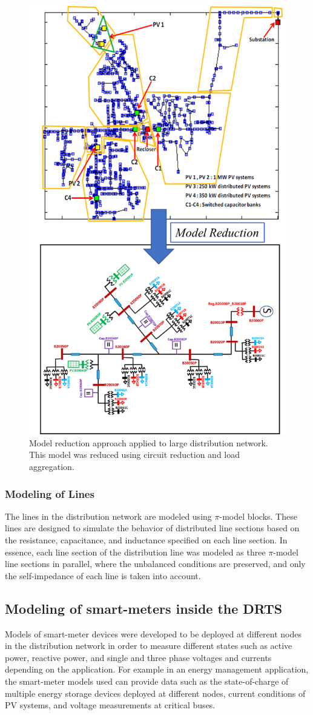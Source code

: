 \begin{figure}[!ht]
    \centering
    \includegraphics[width = 0.5\linewidth]{figs_juan/model_reduction.png}
    \caption{Model reduction approach applied to large distribution network. This model was reduced using circuit reduction and load aggregation.}
    \label{fig:modelreduction}
\end{figure}





\subsubsection{Modeling of Lines} The lines in the distribution network are modeled using $\pi$-model blocks. These lines are designed to simulate the behavior of distributed line sections based on the resistance, capacitance, and inductance specified on each line section. In essence, each line section of the distribution line was modeled as three $\pi$-model line sections in parallel, where the unbalanced conditions are preserved, and only the self-impedance of each line is taken into account. 


\subsection{Modeling of smart-meters inside the DRTS}
Models of smart-meter devices were developed to be deployed at different nodes in the distribution network in order to measure different states such as active power, reactive power, and single and three phase voltages and currents depending on the application. For example in an energy management application, the smart-meter models used can provide data such as the state-of-charge of multiple energy storage devices deployed at different nodes, current conditions of PV systems, and voltage measurements at critical buses.

